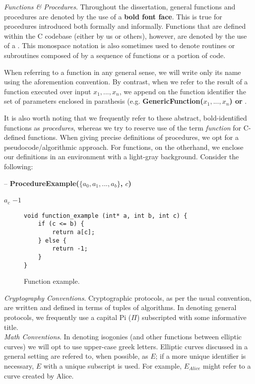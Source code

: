 \noindent
\textit{Functions \& Procedures}. Throughout the dissertation, general functions and procedures are denoted by the use of a \textbf{bold font face}. This is true for procedures introduced both formally and informally. Functions that are defined within the \sidh C codebase (either by us or others), however, are denoted by the use of a . This monospace notation is also sometimes used to denote routines or subroutines composed of by a sequence of functions or a portion of code. 

When referring to a function in any general sense, we will write only its name using the aforemention convention. By contrast, when we refer to the result of a function executed over input $x_{1}, ..., x_{n}$, we append on the function identifier the set of parameters enclosed in parathesis (e.g. \textbf{GenericFunction($x_{1}, ..., x_{n}$) or }. 

It is also worth noting that we frequently refer to these abstract, bold-identified functions as \textit{procedures}, whereas we try to reserve use of the term \textit{function} for C-defined \sidh functions. When giving precise definitions of procedures, we opt for a pseudocode/algorithmic approach. For functions, on the otherhand, we enclose our definitions in an environment with a light-gray background. Consider the following: \\

\begin{algorithm}
\caption{-- \textbf{ProcedureExample($\{a_0, a_1, ... , a_b\}$, $c$)}}\label{alg:procedureexample}
\begin{algorithmic}[1]
	\State \Return $a_c$
\Else
	\State \Return $-1$
\EndIf
\end{algorithmic}
\end{algorithm}

\begin{figure}[!h]
\label{code:pbinv}
\begin{lstlisting}
void function_example (int* a, int b, int c) {
	if (c <= b) {
		return a[c];
	} else {
		return -1;
	}
}
\end{lstlisting}
\caption{Function example.}
\end{figure}

\noindent
\textit{Cryptography Conventions}. Cryptographic protocols, as per the usual convention, are written and defined in terms of tuples of algorithms. In denoting general protocols, we frequently use a capital Pi ($\Pi$) subscripted with some informative title.\\

\noindent
\textit{Math Conventions}. In denoting isogonies (and other functions between elliptic curves) we will opt to use upper-case greek letters. Elliptic curves discussed in a general setting are refered to, when possible, as $E$; if a more unique identifier is necessary, $E$ with a unique subscript is used. For example, $E_{Alice}$ might refer to a curve created by Alice.  


